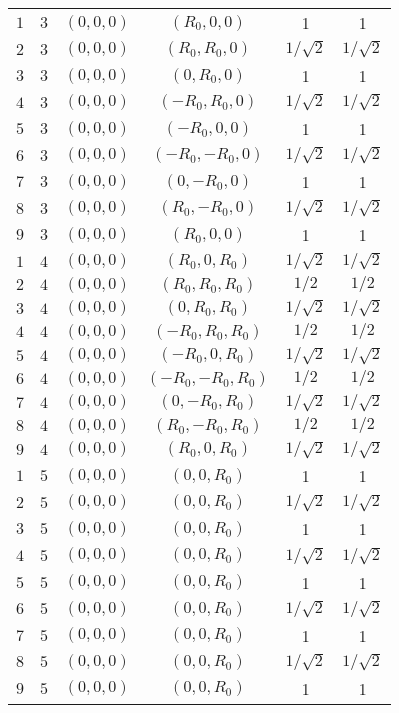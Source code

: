 \begin{center}
\begin{longtable}{c c c c c c}
	$1$		&	$3$	&	$(0, 0, 0)$		&	$( R_0, 0  , 0)$		& 1 			& 1				\\
	$2$		&	$3$	&	$(0, 0, 0)$		&	$( R_0, R_0, 0)$		& $1/\sqrt{2}$ 	& $1/\sqrt{2}$ 	\\
	$3$		&	$3$	&	$(0, 0, 0)$		&	$( 0  , R_0, 0)$		& 1 			& 1				\\
	$4$		&	$3$	&	$(0, 0, 0)$		&	$(-R_0, R_0, 0)$		& $1/\sqrt{2}$ 	& $1/\sqrt{2}$ 	\\
	$5$		&	$3$	&	$(0, 0, 0)$		&	$(-R_0, 0  , 0)$		& 1 			& 1				\\
	$6$		&	$3$	&	$(0, 0, 0)$		&	$(-R_0,-R_0, 0)$		& $1/\sqrt{2}$ 	& $1/\sqrt{2}$ 	\\
	$7$		&	$3$	&	$(0, 0, 0)$		&	$( 0  ,-R_0, 0)$		& 1 			& 1				\\
	$8$		&	$3$	&	$(0, 0, 0)$		&	$( R_0,-R_0, 0)$		& $1/\sqrt{2}$ 	& $1/\sqrt{2}$ 	\\
	$9$		&	$3$	&	$(0, 0, 0)$		&	$( R_0, 0  , 0)$		& 1 			& 1				\\
	
	$1$		&	$4$	&	$(0, 0, 0)$		&	$( R_0, 0  , R_0)$		& $1/\sqrt{2}$ 	& $1/\sqrt{2}$	\\
	$2$		&	$4$	&	$(0, 0, 0)$		&	$( R_0, R_0, R_0)$		& $1/2$ 		& $1/2$ 		\\
	$3$		&	$4$	&	$(0, 0, 0)$		&	$( 0  , R_0, R_0)$		& $1/\sqrt{2}$ 	& $1/\sqrt{2}$	\\
	$4$		&	$4$	&	$(0, 0, 0)$		&	$(-R_0, R_0, R_0)$		& $1/2$ 		& $1/2$ 		\\
	$5$		&	$4$	&	$(0, 0, 0)$		&	$(-R_0, 0  , R_0)$		& $1/\sqrt{2}$	& $1/\sqrt{2}$	\\
	$6$		&	$4$	&	$(0, 0, 0)$		&	$(-R_0,-R_0, R_0)$  		& $1/2$ 		& $1/2$ 		\\
	$7$		&	$4$	&	$(0, 0, 0)$		&	$( 0  ,-R_0, R_0)$		& $1/\sqrt{2}$ 	& $1/\sqrt{2}$	\\
	$8$		&	$4$	&	$(0, 0, 0)$		&	$( R_0,-R_0, R_0)$		& $1/2$ 		& $1/2$ 		\\
	$9$		&	$4$	&	$(0, 0, 0)$		&	$( R_0, 0  , R_0)$		& $1/\sqrt{2}$ 	& $1/\sqrt{2}$	\\
	
	$1$		&	$5$	&	$(0, 0, 0)$		&	$(0, 0, R_0)$		& 1 			& 1				\\
	$2$		&	$5$	&	$(0, 0, 0)$		&	$(0, 0, R_0)$ 		& $1/\sqrt{2}$ 	& $1/\sqrt{2}$ 	\\
	$3$		&	$5$	&	$(0, 0, 0)$		&	$(0, 0, R_0)$		& 1 			& 1				\\
	$4$		&	$5$	&	$(0, 0, 0)$		&	$(0, 0, R_0)$		& $1/\sqrt{2}$ 	& $1/\sqrt{2}$ 	\\
	$5$		&	$5$	&	$(0, 0, 0)$		&	$(0, 0, R_0)$		& 1 			& 1				\\
	$6$		&	$5$	&	$(0, 0, 0)$		&	$(0, 0, R_0)$		& $1/\sqrt{2}$ 	& $1/\sqrt{2}$ 	\\
	$7$		&	$5$	&	$(0, 0, 0)$		&	$(0, 0, R_0)$		& 1 			& 1				\\
	$8$		&	$5$	&	$(0, 0, 0)$		&	$(0, 0, R_0)$		& $1/\sqrt{2}$ 	& $1/\sqrt{2}$ 	\\
	$9$		&	$5$	&	$(0, 0, 0)$		&	$(0, 0, R_0)$		& 1 			& 1				\\
\end{longtable}
\end{center}
